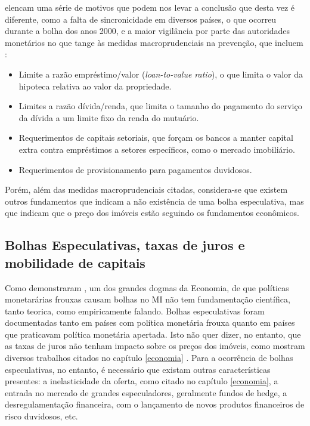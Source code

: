 \documentclass[
	12pt,				%
	oneside,			%
	a4paper,			%
	chapter=TITLE,		%
	section=TITLE,		%
	english,			%
	brazil				%
	]{abntex2}
\begin{document}
\begin{refsection}
\textcite{fmitwa} elencam uma série de motivos que podem nos levar a conclusão que desta
vez é diferente, como a falta de sincronicidade em diversos países, o que
ocorreu durante a bolha dos anos 2000, e a maior vigilância por parte das
autoridades monetários no que tange às medidas macroprudenciais na prevenção,
que incluem \autocite{fmiem}:
\begin{itemize}
\tightlist
\item
  Limite a razão empréstimo/valor (\emph{loan-to-value ratio}), o que limita o valor
  da hipoteca relativa ao valor da propriedade.
\item
  Limites a razão dívida/renda, que limita o tamanho do pagamento do serviço da
  dívida a um limite fixo da renda do mutuário.
\item
  Requerimentos de capitais setoriais, que forçam os bancos a manter capital
  extra contra empréstimos a setores específicos, como o mercado imobiliário.
\item
  Requerimentos de provisionamento para pagamentos duvidosos.
\end{itemize}
Porém, além das medidas macroprudenciais citadas, considera-se que existem
outros fundamentos que indicam a não existência de uma bolha especulativa, mas
que indicam que o preço dos imóveis estão seguindo os fundamentos econômicos.

\hypertarget{bolhas-especulativas-taxas-de-juros-e-mobilidade-de-capitais}{%
\subsection{Bolhas Especulativas, taxas de juros e mobilidade de capitais}\label{bolhas-especulativas-taxas-de-juros-e-mobilidade-de-capitais}}

Como demonstraram \textcite{joebges}, um dos grandes dogmas da Economia, de que políticas
monetarárias frouxas causam bolhas no \gls{MI} não tem fundamentação científica,
tanto teorica, como empiricamente falando. Bolhas especulativas foram
documentadas tanto em países com política monetária frouxa quanto em países que
praticavam política monetária apertada. Isto não quer dizer, no entanto, que as
taxas de juros não tenham impacto sobre os preços dos imóveis, como mostram
diversos trabalhos citados no capítulo \ref{economia} \autocites{macroHousing}{goodhart2008}{ADAMS2010}. Para a ocorrência de bolhas especulativas, no
entanto, é necessário que existam outras características presentes: a
inelasticidade da oferta, como citado no capítulo \ref{economia}, a entrada no
mercado de grandes especuladores, geralmente fundos de hedge, a
desregulamentação financeira, com o lançamento de novos produtos financeiros de
risco duvidosos, etc.


\end{refsection}
\end{document}

